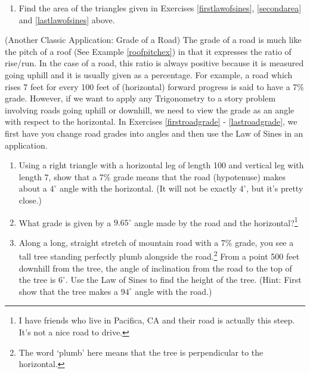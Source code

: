 \begin{enumerate}

\setcounter{enumi}{\value{HW}}

\bigskip

\item Find the area of the triangles given in Exercises \ref{firstlawofsines}, \ref{secondarea} and \ref{lastlawofsines} above.

\setcounter{HW}{\value{enumi}}

\end{enumerate}

\label{gradeofroad}
(Another Classic Application:  Grade of a Road) The grade of a road is much like the pitch of a roof (See Example \ref{roofpitchex}) in that it expresses the ratio of rise/run.  In the case of a road, this ratio is always positive because it is measured going uphill and it is usually given as a percentage.  For example, a road which rises 7 feet for every 100 feet of (horizontal) forward progress is said to have a 7\% grade.  However, if we want to apply any Trigonometry to a story problem involving roads going uphill or downhill, we need to view the grade as an angle with respect to the horizontal.  In Exercises \ref{firstroadgrade} - \ref{lastroadgrade}, we first have you change road grades into angles and then use the Law of Sines in an application.

\begin{enumerate}

\setcounter{enumi}{\value{HW}}

\item Using a right triangle with a horizontal leg of length 100 and vertical leg with length 7, show that a 7\% grade means that the road (hypotenuse) makes about a $4^{\circ}$ angle with the horizontal.  (It will not be exactly $4^{\circ}$, but it's pretty close.) \label{firstroadgrade}

\item What grade is given by a $9.65^{\circ}$ angle made by the road and the horizontal?\footnote{I have friends who live in Pacifica, CA and their road is actually this steep.  It's not a nice road to drive.}

\item Along a long, straight stretch of mountain road with a 7\% grade, you see a tall tree standing perfectly plumb alongside the road.\footnote{The word `plumb' here means that the tree is perpendicular to the horizontal.}  From a point 500 feet downhill from the tree, the angle of inclination from the road to the top of the tree is $6^{\circ}$.  Use the Law of Sines to find the height of the tree.  (Hint: First show that the tree makes a $94^{\circ}$ angle with the road.) \label{lastroadgrade}

\setcounter{HW}{\value{enumi}}

\end{enumerate}

